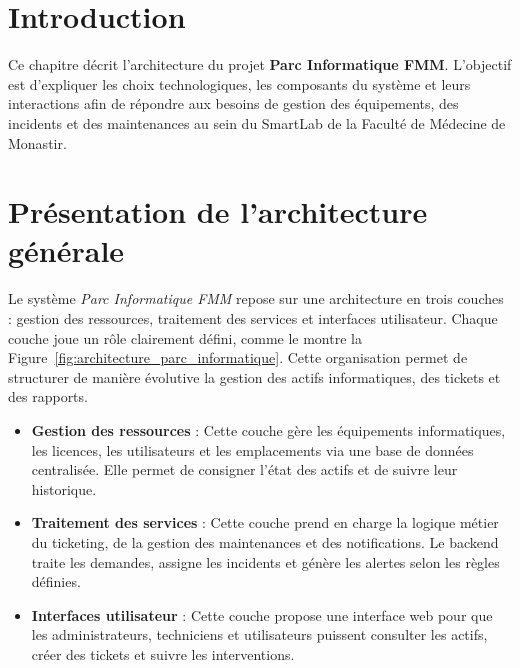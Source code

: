 \vspace{1cm}
\label{chap:architecture}
\setcounter{chapter}{3}
\setcounter{section}{0}

\localtableofcontents
\newpage
\pagebreak
\section*{Introduction}
\label{sec:introduction}
Ce chapitre décrit l'architecture du projet \textbf{Parc Informatique FMM}. L'objectif est d'expliquer les choix technologiques, les composants du système et leurs interactions afin de répondre aux besoins de gestion des équipements, des incidents et des maintenances au sein du SmartLab de la Faculté de Médecine de Monastir.

\section{Présentation de l'architecture générale}
\label{sec:architecture_globale}
Le système \textit{Parc Informatique FMM} repose sur une architecture en trois couches : gestion des ressources, traitement des services et interfaces utilisateur. Chaque couche joue un rôle clairement défini, comme le montre la Figure~\ref{fig:architecture_parc_informatique}. Cette organisation permet de structurer de manière évolutive la gestion des actifs informatiques, des tickets et des rapports.

\begin{itemize}
    \item \textbf{Gestion des ressources} : Cette couche gère les équipements informatiques, les licences, les utilisateurs et les emplacements via une base de données centralisée. Elle permet de consigner l'état des actifs et de suivre leur historique.
    \item \textbf{Traitement des services} : Cette couche prend en charge la logique métier du ticketing, de la gestion des maintenances et des notifications. Le backend traite les demandes, assigne les incidents et génère les alertes selon les règles définies.
    \item \textbf{Interfaces utilisateur} : Cette couche propose une interface web pour que les administrateurs, techniciens et utilisateurs puissent consulter les actifs, créer des tickets et suivre les interventions.
\end{itemize}

